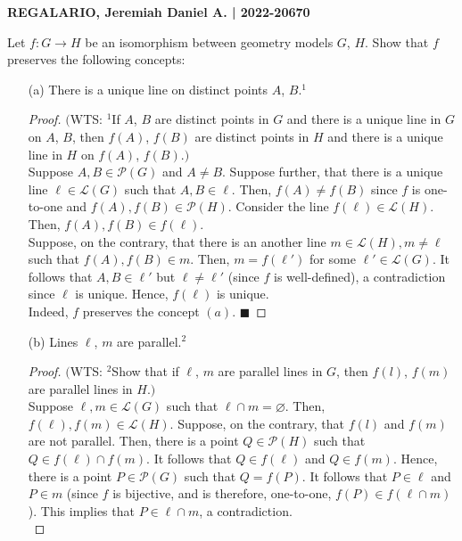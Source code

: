 \documentclass[a4paper, 10pt]{exam}
\begin{document}
\textbf{REGALARIO, Jeremiah Daniel A. | 2022-20670}
\begin{questions}
    \question Let $f: G \to H$ be an isomorphism between geometry models $G$, $H$. Show that $f$ preserves the following concepts:
    \begin{enumerate}
      \item[(a)] There is a unique line on distinct points $A$, $B$.$^{1}$
      \begin{proof}
            $($WTS: $^1$If $A$, $B$ are distinct points in $G$ and there is a unique line in $G$ on $A$, $B$, then $f(A)$, $f(B)$ are distinct points in $H$ and there is a unique line in $H$ on $f(A)$, $f(B)$.$)$ \\
           
            Suppose $A, B \in \mathscr{P}(G)$ and $A \neq B$. Suppose further, that there is a unique line $\ell \in \mathscr{L}(G)$ such that $A, B \in \ell$. Then, $f(A) \neq f(B)$ since $f$ is one-to-one and $f(A), f(B) \in \mathscr{P}(H)$. Consider the line $f(\ell)  \in \mathscr{L}(H)$. Then, $f(A), f(B) \in f(\ell)$.\\

            Suppose, on the contrary, that there is an another line $m \in\mathscr{L}(H), m \neq \ell$ such that $f(A), f(B) \in m$. Then, $m = f(\ell')$ for some $\ell' \in \mathscr{L}(G)$. It follows that $A, B \in \ell'$ but $\ell \neq \ell'$ (since $f$ is well-defined), a contradiction since $\ell$ is unique. Hence, $f(\ell)$ is unique. \\ 

           Indeed, $f$ preserves the concept $(a)$. $\blacksquare$
        \end{proof}
      \item[(b)] Lines $\ell$, $m$ are parallel.$^{2}$
      \begin{proof}
            $($WTS: $^2$Show that if $\ell$, $m$ are parallel lines in $G$, then $f(l)$, $f(m)$ are parallel lines in $H$.$)$ \\
           
            Suppose $\ell, m \in \mathscr{L}(G)$ such that $\ell \cap m = \varnothing$. Then, $f(\ell), f(m) \in \mathscr{L}(H)$. Suppose, on the contrary, that $f(l)$ and $f(m)$ are not parallel. Then, there is a point $Q \in \mathscr{P}(H)$ such that $Q \in f(\ell) \cap f(m)$.  It follows that $Q \in f(\ell)$ and $Q \in f(m)$. Hence, there is a point $P \in \mathscr{P}(G)$ such that $Q = f(P)$. It follows that $P \in \ell$ and $P \in m$ (since $f$ is bijective, and is therefore, one-to-one, $f(P) \in f(\ell \cap m)$). This implies that $P \in \ell \cap m$, a contradiction.\\
           

\end{proof}
\end{enumerate}
\end{questions}
\end{document}
